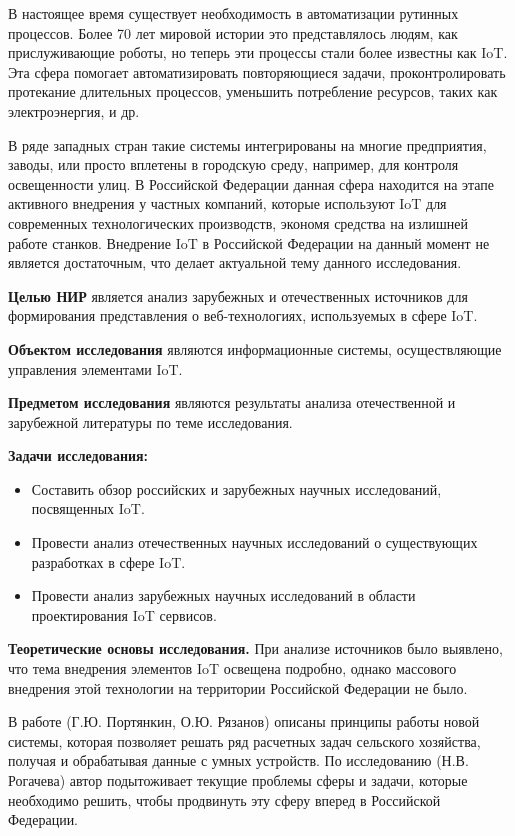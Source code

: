 
В настоящее время существует необходимость в автоматизации рутинных процессов. Более 70 лет мировой истории это представлялось людям, как прислуживающие роботы, но теперь эти процессы стали более известны как IoT.   Эта сфера помогает автоматизировать повторяющиеся задачи, проконтролировать протекание длительных процессов, уменьшить потребление ресурсов, таких как электроэнергия, и др.

В ряде западных стран такие системы интегрированы на многие предприятия, заводы, или просто вплетены в городскую среду, например, для контроля освещенности улиц. В Российской Федерации данная сфера находится на этапе активного внедрения у частных компаний, которые используют IoT для современных технологических производств, экономя средства на излишней работе станков. Внедрение IoT в Российской Федерации на данный момент не является достаточным, что делает актуальной тему данного исследования.

\textbf{Целью НИР} является анализ зарубежных и отечественных источников для формирования представления о веб-технологиях, используемых в сфере IoT.

\textbf{Объектом исследования} являются информационные системы, осуществляющие управления элементами IoT.

\textbf{Предметом исследования} являются результаты анализа отечественной и зарубежной литературы по теме исследования.

\textbf{Задачи исследования:}


\begin{itemize}
  \item Составить обзор российских и зарубежных научных исследований, посвященных IoT.
  \item Провести анализ отечественных научных исследований о существующих разработках в сфере IoT.
  \item Провести анализ зарубежных научных исследований в области проектирования IoT сервисов.
\end{itemize}


\textbf{Теоретические основы исследования.}	При анализе источников было выявлено, что тема внедрения элементов IoT освещена подробно, однако массового внедрения этой технологии на территории Российской Федерации не было. 

В работе (Г.Ю. Портянкин, О.Ю. Рязанов) описаны принципы работы новой системы, которая позволяет решать ряд расчетных задач сельского хозяйства, получая и обрабатывая данные с умных устройств. По исследованию (Н.В. Рогачева) автор подытоживает текущие проблемы сферы и задачи, которые необходимо решить, чтобы продвинуть эту сферу вперед в Российской Федерации.

